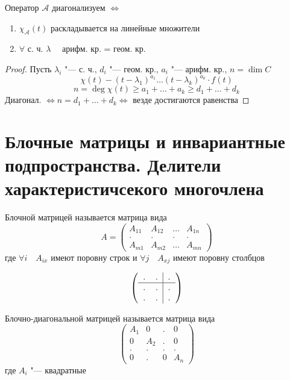 \begin{implication}
	Оператор $ \mathcal{A} $ диагонализуем $ \iff $
	\begin{enumerate}
		\item $ \chi_{\mathcal{A}}(t) $ раскладывается на линейные множители
		\item $ \forall $ с. ч. $ \lambda \quad $ арифм. кр. = геом. кр.
	\end{enumerate}
\end{implication}

\begin{proof}
	Пусть $ \lambda_i $ "--- с. ч., $ d_i $ "--- геом. кр., $ a_i $ "--- арифм. кр., $ n = \dim C $
	$$ \chi(t) - (t - \lambda_1)^{a_1} \dots(t - \lambda_k)^{a_k} \cdot f(t) $$
	$$ n = \deg \chi(t) \ge a_1 + \dots + a_k \ge d_1 + \dots + d_k $$
	Диагонал. $ \iff n = d_1 + \dots + d_k \iff $ везде достигаются равенства
\end{proof}

\section{Блочные матрицы и инвариантные подпространства. Делители характеристичсекого многочлена}

\begin{definition}
	Блочной матрицей называется матрица вида
	$$ A =
	\begin{pmatrix}
		A_{11} & A_{12} & \dots & A_{1n} \\
		. & . & . & . \\
		A_{m1} & A_{m2} & \dots & A_{mn}
	\end{pmatrix} $$
	где $ \forall i \quad A_{ix} $ имеют поровну строк и $ \forall j \quad A_{xj} $ имеют поровну столбцов
\end{definition}

\begin{eg}
	$$ \left(
	\begin{tabular}{c c | c}
		. & . & . \\
		\hline
		. & . & . \\
		. & . & .
	\end{tabular} \right) $$
\end{eg}

\begin{definition}
	Блочно-диагональной матрицей называется матрица вида
	$$
	\begin{pmatrix}
		A_1 & 0 & . & 0 \\
		0 & A_2 & . & 0 \\
		. & . & . & . \\
		0 & . & 0 & A_n
	\end{pmatrix} $$
	где $ A_i $ "--- квадратные
\end{definition}

